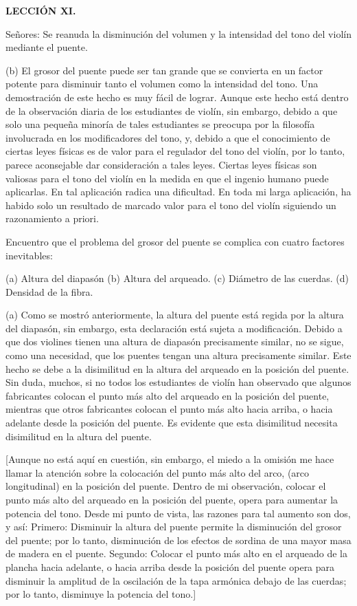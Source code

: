 \documentclass[12pt]{book}
\begin{document}
\textbf{LECCIÓN XI.}

Señores: Se reanuda la disminución del volumen y la intensidad del tono del violín mediante el puente.

(b) El grosor del puente puede ser tan grande que se convierta en un factor potente para disminuir tanto el volumen como la intensidad del tono. Una demostración de este hecho es muy fácil de lograr. Aunque este hecho está dentro de la observación diaria de los estudiantes de violín, sin embargo, debido a que solo una pequeña minoría de tales estudiantes se preocupa por la filosofía involucrada en los modificadores del tono, y, debido a que el conocimiento de ciertas leyes físicas es de valor para el regulador del tono del violín, por lo tanto, parece aconsejable dar consideración a tales leyes. Ciertas leyes físicas son valiosas para el tono del violín en la medida en que el ingenio humano puede aplicarlas. En tal aplicación radica una dificultad. En toda mi larga aplicación, ha habido solo un resultado de marcado valor para el tono del violín siguiendo un razonamiento a priori.

Encuentro que el problema del grosor del puente se complica con cuatro factores inevitables:

(a) Altura del diapasón (b) Altura del arqueado. (c) Diámetro de las cuerdas. (d) Densidad de la fibra.

(a) Como se mostró anteriormente, la altura del puente está regida por la altura del diapasón, sin embargo, esta declaración está sujeta a modificación. Debido a que dos violines tienen una altura de diapasón precisamente similar, no se sigue, como una necesidad, que los puentes tengan una altura precisamente similar. Este hecho se debe a la disimilitud en la altura del arqueado en la posición del puente. Sin duda, muchos, si no todos los estudiantes de violín han observado que algunos fabricantes colocan el punto más alto del arqueado en la posición del puente, mientras que otros fabricantes colocan el punto más alto hacia arriba, o hacia adelante desde la posición del puente. Es evidente que esta disimilitud necesita disimilitud en la altura del puente.

[Aunque no está aquí en cuestión, sin embargo, el miedo a la omisión me hace llamar la atención sobre la colocación del punto más alto del arco, (arco longitudinal) en la posición del puente. Dentro de mi observación, colocar el punto más alto del arqueado en la posición del puente, opera para aumentar la potencia del tono. Desde mi punto de vista, las razones para tal aumento son dos, y así: Primero: Disminuir la altura del puente permite la disminución del grosor del puente; por lo tanto, disminución de los efectos de sordina de una mayor masa de madera en el puente. Segundo: Colocar el punto más alto en el arqueado de la plancha hacia adelante, o hacia arriba desde la posición del puente opera para disminuir la amplitud de la oscilación de la tapa armónica debajo de las cuerdas; por lo tanto, disminuye la potencia del tono.]
\end{document}
